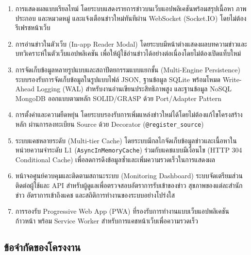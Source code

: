 \begin{enumerate}[label=\arabic*)]
    \item การแสดงผลแบบเรียลไทม์ โดยระบบแสดงรายการข่าวบนเว็บแอปพลิเคชันพร้อมสรุปเนื้อหา ภาพประกอบ และหมวดหมู่ และแจ้งเตือนข่าวใหม่ทันทีผ่าน WebSocket (Socket.IO) โดยไม่ต้องรีเฟรชหน้าเว็บ
    \item การอ่านข่าวในตัวเว็บ (In-app Reader Modal) โดยระบบมีหน้าต่างแสดงผลบทความข่าวและบทวิเคราะห์ในตัวเว็บแอปพลิเคชัน เพื่อให้ผู้ใช้อ่านข่าวได้อย่างต่อเนื่องโดยไม่ต้องเปิดแท็บใหม่
    \item การจัดเก็บข้อมูลหลายรูปแบบและสถาปัตยกรรมแบบแยกชั้น (Multi-Engine Persistence) ระบบรองรับการจัดเก็บข้อมูลในรูปแบบไฟล์ JSON, ฐานข้อมูล SQLite พร้อมโหมด Write-Ahead Logging (WAL) สำหรับงานอ่านเขียนประสิทธิภาพสูง และฐานข้อมูล NoSQL MongoDB ออกแบบตามหลัก SOLID/GRASP ด้วย Port/Adapter Pattern
    \item การตั้งค่าและความยืดหยุ่น โดยระบบรองรับการเพิ่มแหล่งข่าวใหม่ได้โดยไม่ต้องแก้ไขโครงสร้างหลัก ผ่านการลงทะเบียน Source ด้วย Decorator (\texttt{@register\_source})
    \item ระบบแคชหลายระดับ (Multi-tier Cache) โดยระบบมีกลไกจัดเก็บข้อมูลข่าวและเนื้อหาในหน่วยความจำระดับ L1 (\texttt{AsyncInMemoryCache}) ร่วมกับแคชแบบมีเงื่อนไข (HTTP 304 Conditional Cache) เพื่อลดการดึงข้อมูลซ้ำและเพิ่มความรวดเร็วในการแสดงผล
    \item หน้าจอศูนย์ควบคุมและติดตามสถานะระบบ (Monitoring Dashboard) ระบบจัดเตรียมส่วนติดต่อผู้ใช้และ API สำหรับผู้ดูแลเพื่อตรวจสอบอัตราการรับเข้าของข่าว สุขภาพของแต่ละสำนักข่าว อัตราการเข้าถึงแคช และสถิติการทำงานของระบบอย่างโปร่งใส
    \item การรองรับ Progressive Web App (PWA) ที่รองรับการทำงานแบบเว็บแอปพลิเคชันก้าวหน้า พร้อม Service Worker สำหรับการแคชหน้าเว็บเพื่อความรวดเร็ว
\end{enumerate}

\subsection{ข้อจำกัดของโครงงาน}

